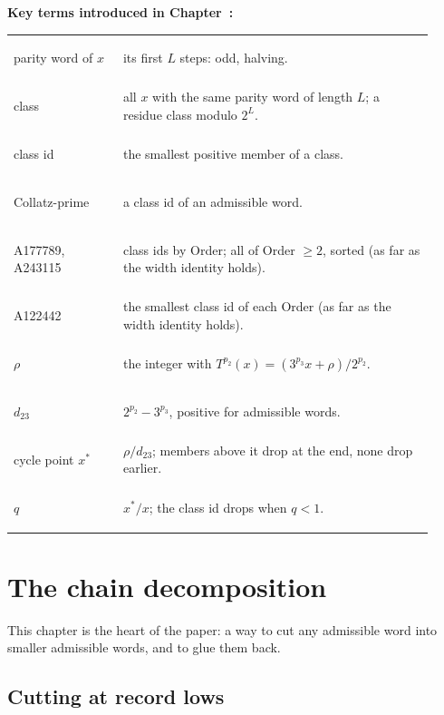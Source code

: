 \documentclass[11pt,a4paper,titlepage]{article}
\makeatletter
\newcommand{\boxhere}[1]{\leavevmode
  \Hy@raisedlink{\hyper@anchorstart{box:#1}\hyper@anchorend}}
\newcommand{\termlink}[2]{\hyperlink{term:#1}{#2}}
\newif\ifpaper
\newenvironment{wordbox}
  {\par\ifpaper\vspace*{\fill}\vspace{\bigskipamount}\else\medskip\fi
   \noindent\begin{lrbox}{\wordboxbin}%
   \begin{minipage}{\dimexpr\linewidth-2\fboxsep-2\fboxrule\relax}\small
   \textbf{Key terms introduced in Chapter~\thesection:}\par\smallskip
   \begin{tabular}{@{}>{\bfseries\boldmath\raggedright\arraybackslash}p{0.24\linewidth}p{0.68\linewidth}@{}}}
  {\end{tabular}\end{minipage}\end{lrbox}%
   \fcolorbox{black!40}{black!3}{\usebox{\wordboxbin}}\par\ifpaper\else\medskip\fi}
\makeatother
\begin{document}
\begin{wordbox}
\boxhere{parityword}parity word of $x$\index{parity word@\termlink{parityword}{parity word}|textbf} & its first $L$ steps: \bw{1} odd, \bw{0} halving. \\
\boxhere{class}class\index{class@\termlink{class}{class}|textbf} & all $x$ with the same parity word of length $L$; a residue class
  modulo $2^L$. \\
\boxhere{classid}class id\index{class id@\termlink{classid}{class id}|textbf} & the smallest positive member of a class. \\
\boxhere{collatzprime}Collatz-prime\index{collatz-prime@\termlink{collatzprime}{Collatz-prime}|textbf} & a class id of an admissible word. \\
A177789, A243115\index{OEIS!A177789}\index{OEIS!A243115} & class ids by Order; all of Order $\ge 2$, sorted (as far as the width identity holds). \\
A122442\index{OEIS!A122442} & the smallest class id of each Order (as far as the width identity holds). \\
\boxhere{rho}$\rho$\index{rho@\termlink{rho}{$\rho$}|textbf} & the integer with $T^{p_2}(x) = (3^{p_3}x + \rho)/2^{p_2}$. \\
\boxhere{d23}$d_{23}$\index{d23@\termlink{d23}{$d_{23}$}|textbf} & $2^{p_2} - 3^{p_3}$, positive for admissible words. \\
\boxhere{cyclepoint}cycle point $x^*$\index{cycle point@\termlink{cyclepoint}{cycle point $x^*$}|textbf} & $\rho/d_{23}$; members above it drop at the end,
  none drop earlier. \\
\boxhere{q}$q$\index{q@\termlink{q}{$q$}|textbf} & $x^*/x$; the class id drops when $q < 1$.
\end{wordbox}

\section{The chain decomposition}
\label{sec:chain}

This chapter is the heart of the paper: a way to cut any admissible word into
smaller admissible words, and to glue them back.

\subsection*{Cutting at record lows}
\end{document}
